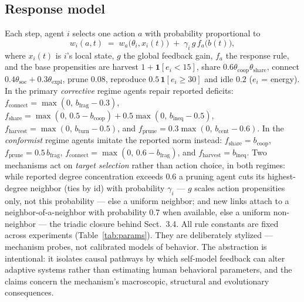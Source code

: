 \documentclass{svproc}
\begin{document}
\subsection{Response model}
Each step, agent $i$ selects one action $a$ with probability proportional to
\begin{equation}
w_i(a,t) \;=\; w_a\big(\theta_i, x_i(t)\big) \;+\; \gamma_i\, g\, f_a\big(b(t)\big),
\label{eq:response}
\end{equation}
where $x_i(t)$ is $i$'s local state, $g$ the global feedback gain, $f_a$ the
response rule, and the
base propensities are harvest $1+\mathbf{1}[e_i<15]$, share
$0.6\theta_{\mathrm{coop}}\theta_{\mathrm{share}}$, connect
$0.4\theta_{\mathrm{soc}}+0.3\theta_{\mathrm{expl}}$, prune $0.08$, reproduce
$0.5\,\mathbf{1}[e_i\geq30]$ and idle $0.2$ ($e_i$ = energy).
In the primary \emph{corrective} regime agents repair reported deficits:
$f_{\mathrm{connect}} = \max(0,\, b_{\mathrm{frag}}-0.3)$,
$f_{\mathrm{share}} = \max(0,\, 0.5-b_{\mathrm{coop}}) + 0.5\max(0,\,
b_{\mathrm{ineq}}-0.5)$,
$f_{\mathrm{harvest}} = \max(0,\, b_{\mathrm{turn}}-0.5)$, and
$f_{\mathrm{prune}} = 0.3\max(0,\, b_{\mathrm{cent}}-0.6)$.
In the \emph{conformist} regime agents imitate the reported norm instead:
$f_{\mathrm{share}} = b_{\mathrm{coop}}$,
$f_{\mathrm{prune}} = 0.5\, b_{\mathrm{frag}}$,
$f_{\mathrm{connect}} = \max(0,\, 0.6-b_{\mathrm{frag}})$, and
$f_{\mathrm{harvest}} = b_{\mathrm{ineq}}$. Two mechanisms act on \emph{target
selection} rather than action choice, in both regimes: while reported degree
concentration exceeds $0.6$ a pruning agent cuts its highest-degree neighbor
(ties by id) with probability $\gamma_i$ --- $g$ scales action propensities
only, not this probability --- else a uniform neighbor; and new links attach
to a neighbor-of-a-neighbor with probability $0.7$ when available, else a
uniform non-neighbor --- the triadic closure behind Sect.~3.4. All rule
constants are fixed across experiments (Table~\ref{tab:params}). They are deliberately
stylized --- mechanism probes, not calibrated models of behavior. The
abstraction is intentional: it isolates causal pathways by which self-model
feedback can alter adaptive systems rather than estimating human behavioral
parameters, and the claims concern the mechanism's macroscopic, structural
and evolutionary consequences.
\end{document}
